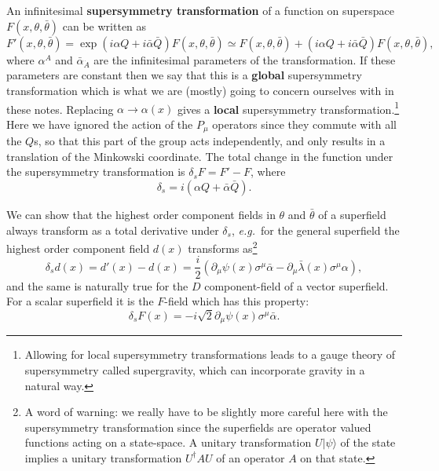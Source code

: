 \documentclass[notes.tex]{subfiles}
\begin{document}
An infinitesimal {\bf supersymmetry transformation} of a function on superspace $F(x,\theta,\bar\theta)$ can be written as
\begin{equation}
F'(x,\theta,\bar\theta)=\exp(i\alpha Q + i\bar{\alpha}\bar{Q}) F(x,\theta,\bar\theta)\simeq F(x,\theta,\bar\theta) +  (i\alpha Q + i\bar{\alpha}\bar{Q}) F(x,\theta,\bar\theta),
\end{equation}
where $\alpha^A$ and $\bar{\alpha}_{\dot{A}}$ are the infinitesimal parameters of the transformation. 
If these parameters are constant then we say that this is a \textbf{global} supersymmetry transformation which is what we are (mostly) going to concern ourselves with in these notes. Replacing $\alpha \to \alpha(x)$ gives a \textbf{local} supersymmetry transformation.\footnote{Allowing for local supersymmetry transformations leads to a gauge theory of supersymmetry called  supergravity, which can incorporate gravity in a natural way.} 
Here we have ignored the action of the $P_\mu$ operators since they commute with all the $Q$s, so that this part of the group acts independently, and only results in a translation of the Minkowski coordinate. The total change in the function under the supersymmetry transformation is $\delta_sF=F'-F$, where
\begin{equation}
\delta_s = i(\alpha Q+\bar\alpha\bar Q).
\label{eq:SUSY_trans}
\end{equation}

We can show that the highest order component fields in $\theta$ and $\bar{\theta}$ of a superfield always transform as a total derivative under $\delta_s$, {\it e.g.}\ for the general superfield the highest order component field $d(x)$ transforms as\footnote{A word of warning: we really have to be slightly more careful here with the supersymmetry transformation since the superfields are operator valued functions acting on a state-space. A unitary transformation $U|\psi\rangle$ of the state implies a unitary transformation $U^\dagger AU$ of an operator $A$ on that state.}
\begin{equation}
\delta_s d(x) = d'(x)-d(x)= \frac{i}{2}(\partial_\mu \psi(x)\sigma^\mu\bar{\alpha} - \partial_\mu \bar{\lambda}(x) \sigma^\mu\alpha),
\end{equation}
and the same is naturally true for the $D$ component-field of a vector superfield. For a scalar superfield it is the $F$-field which has this property:
\begin{equation}
\delta_s F(x) = -i\sqrt{2}\partial_\mu\psi(x)\sigma^\mu\bar{\alpha}.
\end{equation}
\end{document}

